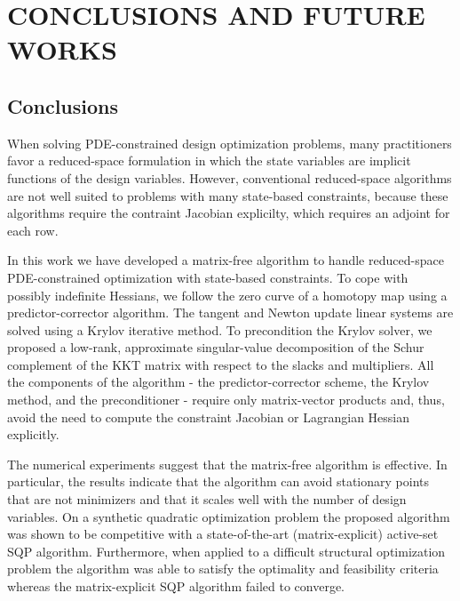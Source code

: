  
\chapter{CONCLUSIONS AND FUTURE WORKS}

\section{Conclusions}
When solving PDE-constrained design optimization problems, many practitioners
favor a reduced-space formulation in which the state variables are implicit
functions of the design variables.  However, conventional reduced-space
algorithms are not well suited to problems with many state-based constraints,
because these algorithms require the contraint Jacobian explicilty, which
requires an adjoint for each row.

In this work we have developed a matrix-free algorithm to handle reduced-space
PDE-constrained optimization with state-based constraints.  To cope with
possibly indefinite Hessians, we follow the zero curve of a homotopy map using a
predictor-corrector algorithm.  The tangent and Newton update linear systems are
solved using a Krylov iterative method.  To precondition the Krylov solver, we
proposed a low-rank, approximate singular-value decomposition of the Schur
complement of the KKT matrix with respect to the slacks and multipliers.  All
the components of the algorithm - the predictor-corrector scheme, the Krylov
method, and the preconditioner - require only matrix-vector products and,
thus, avoid the need to compute the constraint Jacobian or Lagrangian Hessian
explicitly.

The numerical experiments suggest that the matrix-free algorithm is effective.
In particular, the results indicate that the algorithm can avoid stationary
points that are not minimizers and that it scales well with the number of design
variables.  On a synthetic quadratic optimization problem the proposed algorithm
was shown to be competitive with a state-of-the-art (matrix-explicit) active-set
SQP algorithm.  Furthermore, when applied to a difficult structural optimization
problem the algorithm was able to satisfy the optimality and feasibility
criteria whereas the matrix-explicit SQP algorithm failed to converge. 

